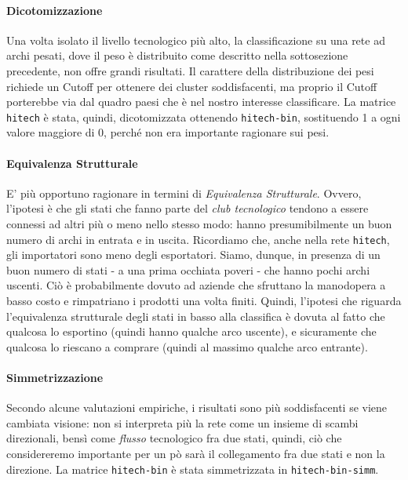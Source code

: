 \documentclass[]{article}
\begin{document}
\begin{multicols}{2}
	\paragraph*{Dicotomizzazione} Una volta isolato il livello tecnologico più alto, la classificazione su una rete ad archi pesati, dove il peso è distribuito come descritto nella sottosezione precedente, non offre grandi risultati. Il carattere della distribuzione dei pesi richiede un Cutoff per ottenere dei cluster soddisfacenti, ma proprio il Cutoff porterebbe via dal quadro paesi che è nel nostro interesse classificare. La matrice \texttt{hitech} è stata, quindi, dicotomizzata ottenendo \texttt{hitech-bin}, sostituendo 1 a ogni valore maggiore di 0, perché non era importante ragionare sui pesi.
	
	\paragraph*{Equivalenza Strutturale} E' più opportuno ragionare in termini di \textit{Equivalenza Strutturale}. Ovvero, l'ipotesi è che gli stati che fanno parte del \textit{club tecnologico} tendono a essere connessi ad altri più o meno nello stesso modo: hanno presumibilmente un buon numero di archi in entrata e in uscita. Ricordiamo che, anche nella rete \texttt{hitech}, gli importatori sono meno degli esportatori. Siamo, dunque, in presenza di un buon numero di stati - a una prima occhiata poveri - che hanno pochi archi uscenti. Ciò è probabilmente dovuto ad aziende che sfruttano la manodopera a basso costo e rimpatriano i prodotti una volta finiti. Quindi, l'ipotesi che riguarda l'equivalenza strutturale degli stati in basso alla classifica è dovuta al fatto che qualcosa lo esportino (quindi hanno qualche arco uscente), e sicuramente che qualcosa lo riescano a comprare (quindi al massimo qualche arco entrante).
	
	\paragraph*{Simmetrizzazione} Secondo alcune valutazioni empiriche, i risultati sono più soddisfacenti se viene cambiata visione: non si interpreta più la rete come un insieme di scambi direzionali, bensì come \textit{flusso} tecnologico fra due stati, quindi, ciò che considereremo importante per un pò sarà il collegamento fra due stati e non la direzione. La matrice \texttt{hitech-bin} è stata simmetrizzata in \texttt{hitech-bin-simm}.


\end{multicols}
\end{document}
